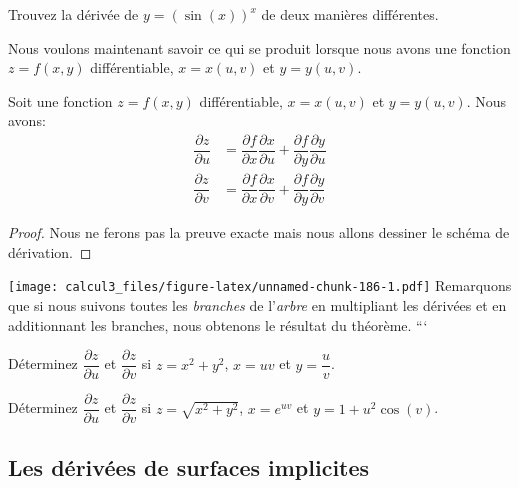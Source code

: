 \documentclass[]{book}
\theoremstyle{definition}
\theoremstyle{definition}
\theoremstyle{definition}
\theoremstyle{remark}
\let\BeginKnitrBlock\begin \let\EndKnitrBlock\end
\begin{document}
\BeginKnitrBlock{example}
\protect\hypertarget{exm:unnamed-chunk-183}{}{\label{exm:unnamed-chunk-183}
}Trouvez la dérivée de \(y=(\sin(x))^x\) de deux manières différentes.
\EndKnitrBlock{example}
\vspace*{10cm}

Nous voulons maintenant savoir ce qui se produit lorsque nous avons une
fonction \(z=f(x,y)\) différentiable, \(x=x(u,v)\) et \(y=y(u,v)\).

\BeginKnitrBlock{theorem}
\protect\hypertarget{thm:unnamed-chunk-184}{}{\label{thm:unnamed-chunk-184}
}Soit une fonction \(z=f(x,y)\) différentiable, \(x=x(u,v)\) et
\(y=y(u,v)\). Nous avons: \begin{align*}
\dfrac{\partial z}{\partial u} &= \dfrac{\partial f}{\partial x}\dfrac{\partial x}{\partial u} + \dfrac{\partial f}{\partial y}\dfrac{\partial y}{\partial u} \\
\dfrac{\partial z}{\partial v} &= \dfrac{\partial f}{\partial x}\dfrac{\partial x}{\partial v} + \dfrac{\partial f}{\partial y}\dfrac{\partial y}{\partial v}
\end{align*}
\EndKnitrBlock{theorem}

\BeginKnitrBlock{proof}
{}Nous ne ferons pas la preuve exacte mais nous
allons dessiner le schéma de dérivation.
\EndKnitrBlock{proof}

\texttt{[image: calcul3\_files/figure-latex/unnamed-chunk-186-1.pdf]}
Remarquons que si nous suivons toutes les \emph{branches} de
l'\emph{arbre} en multipliant les dérivées et en additionnant les
branches, nous obtenons le résultat du théorème. ```

\BeginKnitrBlock{example}
\protect\hypertarget{exm:unnamed-chunk-187}{}{\label{exm:unnamed-chunk-187}
}Déterminez \(\dfrac{\partial z}{\partial u}\) et
\(\dfrac{\partial z}{\partial v}\) si \(z=x^2+y^2\), \(x=uv\) et
\(y=\dfrac{u}{v}\).
\EndKnitrBlock{example}
\vspace*{8cm}

\BeginKnitrBlock{example}
\protect\hypertarget{exm:unnamed-chunk-188}{}{\label{exm:unnamed-chunk-188}
}Déterminez \(\dfrac{\partial z}{\partial u}\) et
\(\dfrac{\partial z}{\partial v}\) si \(z=\sqrt{x^2+y^2}\), \(x=e^{uv}\)
et \(y=1+u^2\cos(v)\).
\EndKnitrBlock{example}
\vspace*{8cm}

\hypertarget{les-derivees-de-surfaces-implicites}{%
\subsection{Les dérivées de surfaces
implicites}\label{les-derivees-de-surfaces-implicites}}
\end{document}

